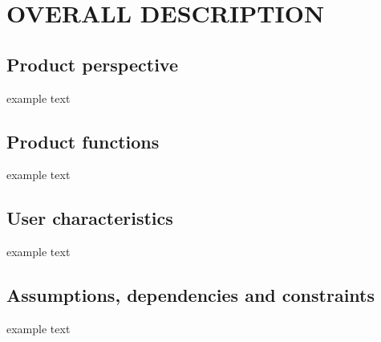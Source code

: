 \section{OVERALL DESCRIPTION}

\subsection{Product	perspective}
	example text
	

\subsection{Product	functions}
	example text
	
	
\subsection{User characteristics}
	example text
	
	
\subsection{Assumptions, dependencies and constraints}
	example text
